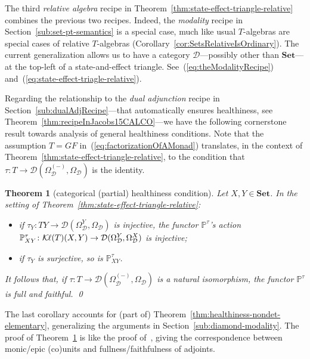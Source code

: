 \documentclass[9pt, preprint]{sigplanconf}
\theoremstyle{theorem}
\newtheorem{theorem}{Theorem}[section]
\theoremstyle{definition}
\newcommand{\cat}[1]{\mathcal{#1}}
\newcommand{\place}{{-}}
\newcommand{\Set}{\mathbf{Set}}
\newcommand{\Sets}{\Set}
\newcommand{\Kl}{\mathcal{K}{\kern-.2ex}\ell}
\newcommand{\OmegaD}{\Omega_{\cat{D}}}
\newcommand{\bbP}{\mathbb{P}}
\begin{document}
The third \emph{relative algebra} recipe in
Theorem~\ref{thm:state-effect-triangle-relative} combines the previous
two recipes. Indeed, the \emph{modality} recipe in
Section~\ref{sub:set-pt-semantics} is a special case, much like usual
$T$-algebras are special cases of relative $T$-algebras
(Corollary~\ref{cor:SetsRelativeIsOrdinary}).  The current
generalization allows us to have a  category $\cat{D}$---possibly other than
$\Sets$---at the top-left of a state-and-effect
triangle. See~(\ref{eq:theModalityRecipe})
and~(\ref{eq:state-effect-triagle-relative}).

Regarding the relationship to the \emph{dual adjunction} recipe in
Section~\ref{sub:dualAdjRecipe}---that automatically ensures
healthiness, see Theorem~\ref{thm:recipeInJacobs15CALCO}---we have the following cornerstone result
towards analysis of general healthiness conditions. Note that the assumption
$T=GF$ in~(\ref{eq:factorizationOfAMonad}) translates, in the context of Theorem~\ref{thm:state-effect-triangle-relative}, to the condition
that $\tau\colon T\to
\cat{D}(\OmegaD^{(\place)}, \OmegaD)$ is the identity.










\begin{theorem}[categorical (partial) healthiness condition]\label{thm:partialHealthiness}
Let $X,Y\in\Sets$. In the setting of
 Theorem~\ref{thm:state-effect-triangle-relative}:
 \begin{itemize}
  \item if $\tau_{Y}\colon TY\to
  \cat{D}(\OmegaD^{Y}, \OmegaD)$ is injective,
	 the functor $\bbP^{\tau}$'s action
\begin{math}
   \bbP^{\tau}_{XY} \colon \Kl(T)(X, Y) \to \cat{D}(\OmegaD^Y, \OmegaD^X)
\end{math}
   is injective;
  \item if $\tau_{Y}$ is surjective, so is $   \bbP^{\tau}_{XY} $.
\end{itemize}
It follows that, if $\tau\colon T\to \cat{D}(\OmegaD^{(\place)},
 \OmegaD)$ is a natural isomorphism, the functor $\bbP^{\tau}$ is full
 and faithful.
\qed
\end{theorem}
 \noindent
 The last corollary accounts for (part of)
 Theorem~\ref{thm:healthiness-nondet-elementary}, generalizing the
 arguments in Section~\ref{sub:diamond-modality}. The proof of
 Theorem~\ref{thm:partialHealthiness} is like the proof
 of~\cite[Theorem~IV.3.1]{MacLane71}, giving the correspondence
 between monic/epic (co)units and fullness/faithfulness of adjoints.
\end{document}
